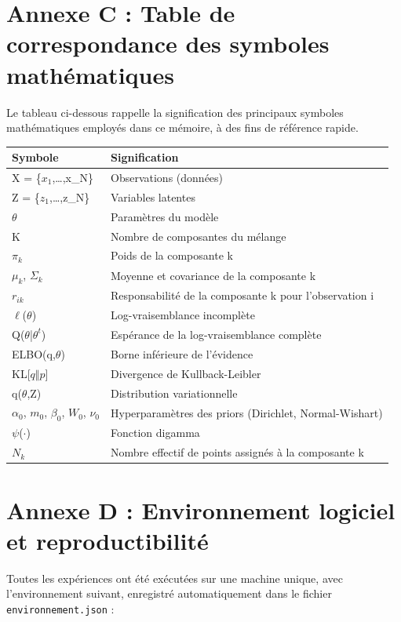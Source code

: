 \section*{Annexe C : Table de correspondance des symboles mathématiques}
Le tableau ci-dessous rappelle la signification des principaux symboles mathématiques employés dans ce mémoire, à des fins de référence rapide.

\begin{table}[H]
\centering
\small
\setlength{\tabcolsep}{0.14cm}
\begin{tabular}{|p{7.42cm}|p{7.42cm}|}
\hline
\textbf{Symbole} & \textbf{Signification} \\
\hline
X = \{$x_{1}$,\ldots{},x\_N\} & Observations (données) \\
\hline
Z = \{$z_{1}$,\ldots{},z\_N\} & Variables latentes \\
\hline
$\theta $ & Paramètres du modèle \\
\hline
K & Nombre de composantes du mélange \\
\hline
$\pi _{k}$ & Poids de la composante k \\
\hline
$\mu _{k}$, $\Sigma _{k}$ & Moyenne et covariance de la composante k \\
\hline
$r_{ik}$ & Responsabilité de la composante k pour l'observation i \\
\hline
$\ell $($\theta $) & Log-vraisemblance incomplète \\
\hline
Q($\theta $|$\theta ^{t}$) & Espérance de la log-vraisemblance complète \\
\hline
ELBO(q,$\theta $) & Borne inférieure de l'évidence \\
\hline
KL[$q\Vert p$] & Divergence de Kullback-Leibler \\
\hline
q($\theta $,Z) & Distribution variationnelle \\
\hline
$\alpha _{0}$, $m_{0}$, $\beta _{0}$, $W_{0}$, $\nu _{0}$ & Hyperparamètres des priors (Dirichlet, Normal-Wishart) \\
\hline
$\psi $($\cdot $) & Fonction digamma \\
\hline
$N_{k}$ & Nombre effectif de points assignés à la composante k \\
\hline
\end{tabular}
\end{table}
\section*{Annexe D : Environnement logiciel et reproductibilité}
Toutes les expériences ont été exécutées sur une machine unique, avec l'environnement suivant, enregistré automatiquement dans le fichier \texttt{environnement.json} :

